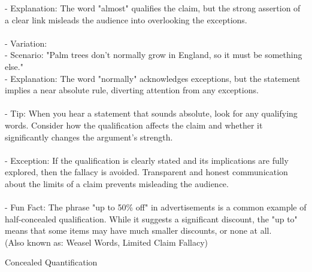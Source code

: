 \documentclass[a4paper,12pt,single,pdftex]{scrbook}
\begin{document}
{    
        - Explanation: The word "almost" qualifies the claim, but the strong assertion of a clear link misleads the audience into overlooking the exceptions.
    \\

    
      
    \\

    
      - Variation:
    \\

    
        - Scenario: "Palm trees don’t normally grow in England, so it must be something else."
    \\

    
        - Explanation: The word "normally" acknowledges exceptions, but the statement implies a near absolute rule, diverting attention from any exceptions.
    \\

    
      
    \\

    
      - Tip: When you hear a statement that sounds absolute, look for any qualifying words. Consider how the qualification affects the claim and whether it significantly changes the argument's strength.
    \\

    
      
    \\

    
      - Exception: If the qualification is clearly stated and its implications are fully explored, then the fallacy is avoided. Transparent and honest communication about the limits of a claim prevents misleading the audience.
    \\

    
      
    \\

    
      - Fun Fact: The phrase "up to 50\% off" in advertisements is a common example of half-concealed qualification. While it suggests a significant discount, the "up to" means that some items may have much smaller discounts, or none at all.
    \\

  
    
      (Also known as: Weasel Words, Limited Claim Fallacy)
    \\

  }


Concealed Quantification
    
\end{document}
